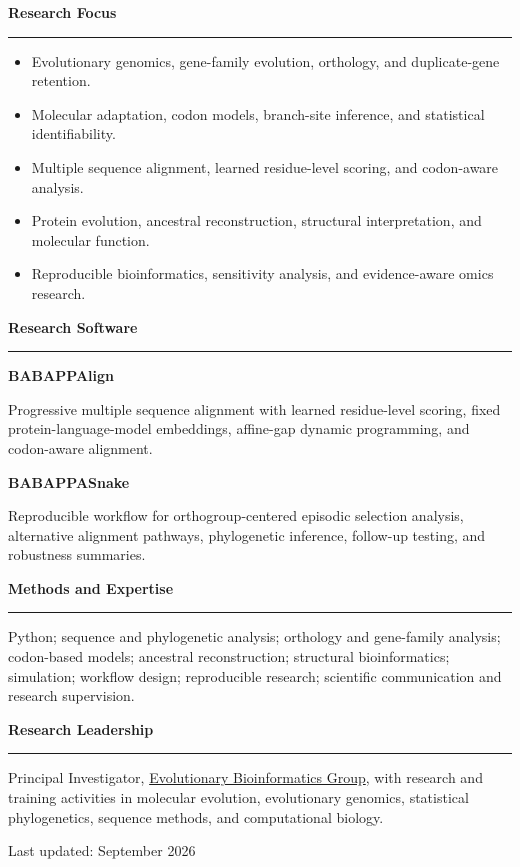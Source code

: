 \documentclass[10pt,a4paper]{article}
\newcommand{\cvlink}[2]{\href{#1}{#2}}
\newcommand{\cvsection}[1]{%
  \par\vspace{5pt}%
  {\large\bfseries\sffamily\color{ink}#1}\par
  \vspace{-2pt}\textcolor{linegray}{\rule{\linewidth}{0.45pt}}\vspace{1.5pt}%
}
\begin{document}
\begin{minipage}[t]{0.60\textwidth}
\raggedright

\cvsection{Research Focus}
\begin{itemize}
  \item Evolutionary genomics, gene-family evolution, orthology, and duplicate-gene retention.
  \item Molecular adaptation, codon models, branch-site inference, and statistical identifiability.
  \item Multiple sequence alignment, learned residue-level scoring, and codon-aware analysis.
  \item Protein evolution, ancestral reconstruction, structural interpretation, and molecular function.
  \item Reproducible bioinformatics, sensitivity analysis, and evidence-aware omics research.
\end{itemize}

\cvsection{Research Software}
\textbf{BABAPPAlign}\par
Progressive multiple sequence alignment with learned residue-level scoring, fixed
protein-language-model embeddings, affine-gap dynamic programming, and codon-aware alignment.

\vspace{3pt}
\textbf{BABAPPASnake}\par
Reproducible workflow for orthogroup-centered episodic selection analysis, alternative
alignment pathways, phylogenetic inference, follow-up testing, and robustness summaries.

\cvsection{Methods and Expertise}
Python; sequence and phylogenetic analysis; orthology and gene-family analysis; codon-based
models; ancestral reconstruction; structural bioinformatics; simulation; workflow design;
reproducible research; scientific communication and research supervision.

\cvsection{Research Leadership}
Principal Investigator, \cvlink{https://sinhakrishnendu.github.io/Lab_website/}{Evolutionary Bioinformatics Group}, with research and training activities in molecular evolution,
evolutionary genomics, statistical phylogenetics, sequence methods, and computational biology.

\end{minipage}

\vfill
{\footnotesize\color{softgray}Last updated: September 2026}
\end{document}
